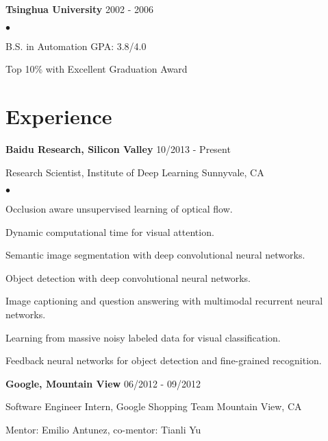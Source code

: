 \documentclass[margin]{res3}
\newenvironment{list1}{
  \begin{list}{\ding{113}}{%
      \setlength{\itemsep}{0.03in}
      \setlength{\parsep}{0in} \setlength{\parskip}{0in}
      \setlength{\topsep}{0in} \setlength{\partopsep}{0in}
      \setlength{\leftmargin}{0in}}}{\end{list}}
\newenvironment{list2}{
  \begin{list}{$\bullet$}{%
      \setlength{\itemsep}{0.02in}
      \setlength{\parsep}{0in} \setlength{\parskip}{0in}
      \setlength{\topsep}{0in} \setlength{\partopsep}{0in}
      \setlength{\leftmargin}{0.2in}}}{\end{list}}
\begin{document}
\begin{resume}
{\bf Tsinghua University} \hfill {2002 - 2006}
\begin{list2}
\item B.S. in Automation \hfill {GPA: 3.8/4.0}
\vspace{-2pt}
\item Top 10\% with Excellent Graduation Award 
\end{list2}


\section{\sc Experience}

\begin{list1}

\item[] {\bf Baidu Research, Silicon Valley} \hfill {10/2013 - Present}
\vspace{-2pt}
\item[] Research Scientist, Institute of Deep Learning \hfill {Sunnyvale, CA}

\begin{list2}
\item Occlusion aware unsupervised learning of optical flow.
\vspace{-2pt}
\item Dynamic computational time for visual attention.
\vspace{-2pt}
\item Semantic image segmentation with deep convolutional neural networks.
\vspace{-2pt}
\item Object detection with deep convolutional neural networks.
\vspace{-2pt}
\item Image captioning and question answering with multimodal recurrent neural networks.
\vspace{-2pt}
\item Learning from massive noisy labeled data for visual classification.
\vspace{-2pt}
\item Feedback neural networks for object detection and fine-grained recognition.
\end{list2}
\vspace{5pt}


\item[] {\bf Google, Mountain View} \hfill {06/2012 - 09/2012}
\vspace{-2pt}
\item[] Software Engineer Intern, Google Shopping Team \hfill {Mountain View, CA}
\vspace{-2pt}
\item[] Mentor: Emilio Antunez, co-mentor: Tianli Yu 


\end{list1}
\end{resume}
\end{document}
